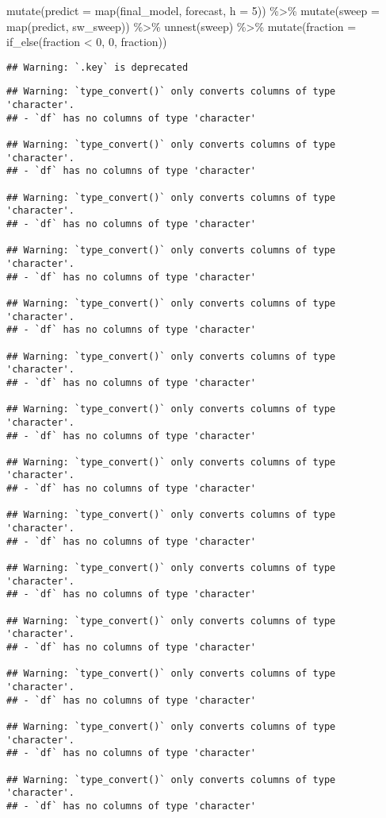 \documentclass[
]{article}
\newenvironment{Shaded}{\begin{snugshade}}{\end{snugshade}}
\newcommand{\AttributeTok}[1]{\textcolor[rgb]{0.77,0.63,0.00}{#1}}
\newcommand{\DecValTok}[1]{\textcolor[rgb]{0.00,0.00,0.81}{#1}}
\newcommand{\FunctionTok}[1]{\textcolor[rgb]{0.00,0.00,0.00}{#1}}
\newcommand{\NormalTok}[1]{#1}
\newcommand{\SpecialCharTok}[1]{\textcolor[rgb]{0.00,0.00,0.00}{#1}}
\begin{document}
\begin{Shaded}
\begin{Highlighting}[]
  \FunctionTok{mutate}\NormalTok{(}\AttributeTok{predict =} \FunctionTok{map}\NormalTok{(final\_model, forecast, }\AttributeTok{h =} \DecValTok{5}\NormalTok{)) }\SpecialCharTok{\%\textgreater{}\%} 
  \FunctionTok{mutate}\NormalTok{(}\AttributeTok{sweep =} \FunctionTok{map}\NormalTok{(predict, sw\_sweep)) }\SpecialCharTok{\%\textgreater{}\%} 
  \FunctionTok{unnest}\NormalTok{(sweep) }\SpecialCharTok{\%\textgreater{}\%} 
  \FunctionTok{mutate}\NormalTok{(}\AttributeTok{fraction =} \FunctionTok{if\_else}\NormalTok{(fraction }\SpecialCharTok{\textless{}} \DecValTok{0}\NormalTok{, }\DecValTok{0}\NormalTok{, fraction))}
\end{Highlighting}
\end{Shaded}

\begin{verbatim}
## Warning: `.key` is deprecated
\end{verbatim}

\begin{verbatim}
## Warning: `type_convert()` only converts columns of type 'character'.
## - `df` has no columns of type 'character'

## Warning: `type_convert()` only converts columns of type 'character'.
## - `df` has no columns of type 'character'

## Warning: `type_convert()` only converts columns of type 'character'.
## - `df` has no columns of type 'character'

## Warning: `type_convert()` only converts columns of type 'character'.
## - `df` has no columns of type 'character'

## Warning: `type_convert()` only converts columns of type 'character'.
## - `df` has no columns of type 'character'

## Warning: `type_convert()` only converts columns of type 'character'.
## - `df` has no columns of type 'character'

## Warning: `type_convert()` only converts columns of type 'character'.
## - `df` has no columns of type 'character'

## Warning: `type_convert()` only converts columns of type 'character'.
## - `df` has no columns of type 'character'

## Warning: `type_convert()` only converts columns of type 'character'.
## - `df` has no columns of type 'character'

## Warning: `type_convert()` only converts columns of type 'character'.
## - `df` has no columns of type 'character'

## Warning: `type_convert()` only converts columns of type 'character'.
## - `df` has no columns of type 'character'

## Warning: `type_convert()` only converts columns of type 'character'.
## - `df` has no columns of type 'character'

## Warning: `type_convert()` only converts columns of type 'character'.
## - `df` has no columns of type 'character'

## Warning: `type_convert()` only converts columns of type 'character'.
## - `df` has no columns of type 'character'
\end{verbatim}
\end{document}
